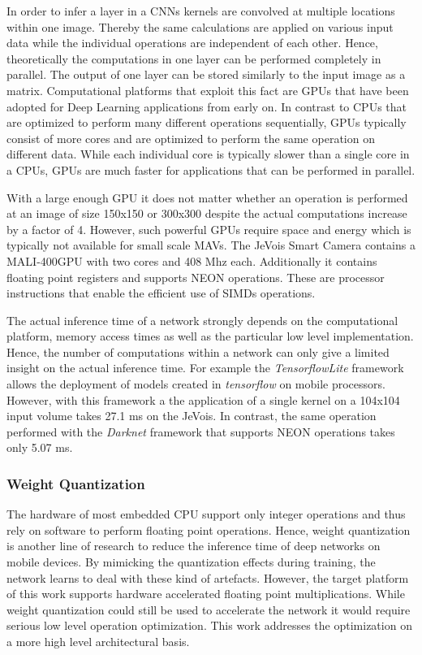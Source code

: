 In order to infer a layer in a \acp{CNN} kernels are convolved at multiple locations within one image. Thereby the same calculations are applied on various input data while the individual operations are independent of each other. Hence, theoretically the computations in one layer can be performed completely in parallel. The output of one layer can be stored similarly to the input image as a matrix. Computational platforms that exploit this fact are \acp{GPU} that have been adopted for Deep Learning applications from early on. In contrast to \acp{CPU} that are optimized to perform many different operations sequentially, \acp{GPU} typically consist of more cores and are optimized to perform the same operation on different data. While each individual core is typically slower than a single core in a \acp{CPU}, \acp{GPU} are much faster for applications that can be performed in parallel.

With a large enough \ac{GPU} it does not matter whether an operation is performed at an image of size 150x150 or 300x300 despite the actual computations increase by a factor of 4. However, such powerful \acp{GPU} require space and energy which is typically not available for small scale \acp{MAV}. The JeVois Smart Camera contains a MALI-400GPU with two cores and 408 Mhz each. Additionally it contains floating point registers and supports NEON operations. These are processor instructions that enable the efficient use of \acp{SIMD} operations.

The actual inference time of a network strongly depends on the computational platform, memory access times as well as the particular low level implementation. Hence, the number of computations within a network can only give a limited insight on the actual inference time. For example the \textit{TensorflowLite} framework allows the deployment of models created in \textit{tensorflow} on mobile processors. However, with this framework a the application of a single kernel on a 104x104 input volume takes 27.1 ms on the JeVois. In contrast, the same operation performed with the \textit{Darknet} framework that supports NEON operations takes only 5.07 ms. 


\subsubsection{Weight Quantization}

The hardware of most embedded \ac{CPU} support only integer operations and thus rely on software to perform floating point operations. Hence, weight quantization is another line of research to reduce the inference time of deep networks on mobile devices. By mimicking the quantization effects during training, the network learns to deal with these kind of artefacts. However, the target platform of this work supports hardware accelerated floating point multiplications. While weight quantization could still be used to accelerate the network it would require serious low level operation optimization. This work addresses the optimization on a more high level architectural basis.

